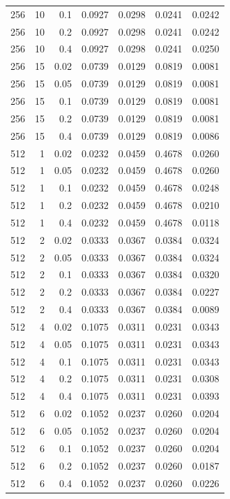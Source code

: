 \begin{table}[t]
\begin{tabular}{lrrrrrr}
256 & 10 & 0.1 & 0.0927 & 0.0298 & 0.0241 & 0.0242 \\
256 & 10 & 0.2 & 0.0927 & 0.0298 & 0.0241 & 0.0242 \\
256 & 10 & 0.4 & 0.0927 & 0.0298 & 0.0241 & 0.0250 \\
256 & 15 & 0.02 & 0.0739 & 0.0129 & 0.0819 & 0.0081 \\
256 & 15 & 0.05 & 0.0739 & 0.0129 & 0.0819 & 0.0081 \\
256 & 15 & 0.1 & 0.0739 & 0.0129 & 0.0819 & 0.0081 \\
256 & 15 & 0.2 & 0.0739 & 0.0129 & 0.0819 & 0.0081 \\
256 & 15 & 0.4 & 0.0739 & 0.0129 & 0.0819 & 0.0086 \\
512 & 1 & 0.02 & 0.0232 & 0.0459 & 0.4678 & 0.0260 \\
512 & 1 & 0.05 & 0.0232 & 0.0459 & 0.4678 & 0.0260 \\
512 & 1 & 0.1 & 0.0232 & 0.0459 & 0.4678 & 0.0248 \\
512 & 1 & 0.2 & 0.0232 & 0.0459 & 0.4678 & 0.0210 \\
512 & 1 & 0.4 & 0.0232 & 0.0459 & 0.4678 & 0.0118 \\
512 & 2 & 0.02 & 0.0333 & 0.0367 & 0.0384 & 0.0324 \\
512 & 2 & 0.05 & 0.0333 & 0.0367 & 0.0384 & 0.0324 \\
512 & 2 & 0.1 & 0.0333 & 0.0367 & 0.0384 & 0.0320 \\
512 & 2 & 0.2 & 0.0333 & 0.0367 & 0.0384 & 0.0227 \\
512 & 2 & 0.4 & 0.0333 & 0.0367 & 0.0384 & 0.0089 \\
512 & 4 & 0.02 & 0.1075 & 0.0311 & 0.0231 & 0.0343 \\
512 & 4 & 0.05 & 0.1075 & 0.0311 & 0.0231 & 0.0343 \\
512 & 4 & 0.1 & 0.1075 & 0.0311 & 0.0231 & 0.0343 \\
512 & 4 & 0.2 & 0.1075 & 0.0311 & 0.0231 & 0.0308 \\
512 & 4 & 0.4 & 0.1075 & 0.0311 & 0.0231 & 0.0393 \\
512 & 6 & 0.02 & 0.1052 & 0.0237 & 0.0260 & 0.0204 \\
512 & 6 & 0.05 & 0.1052 & 0.0237 & 0.0260 & 0.0204 \\
512 & 6 & 0.1 & 0.1052 & 0.0237 & 0.0260 & 0.0204 \\
512 & 6 & 0.2 & 0.1052 & 0.0237 & 0.0260 & 0.0187 \\
512 & 6 & 0.4 & 0.1052 & 0.0237 & 0.0260 & 0.0226 \\

\end{tabular}
\end{table}
